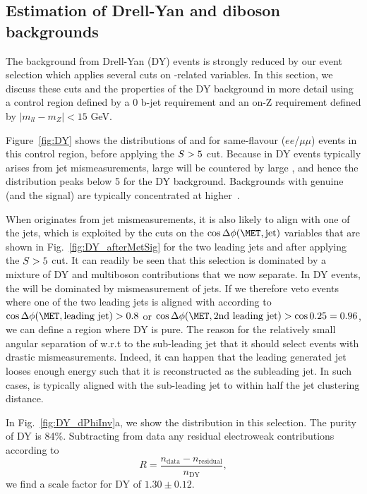 \subsection{Estimation of Drell-Yan and diboson backgrounds}
\label{sec:DY_diboson}

The background from Drell-Yan (DY) events is strongly reduced by our event selection which applies several cuts on \met-related variables.
In this section, we discuss these cuts and the properties of the DY background in more detail using a  
control region defined by a 0 b-jet requirement and an on-Z requirement defined by $|m_{ll} - m_Z| < 15$ GeV.

Figure~\ref{fig:DY} shows the distributions of \metSig and \mtll  for same-flavour ($ee$/$\mu\mu$) events in this control region, 
before applying the $S>5$ cut. Because \met in DY events typically arises from jet mismeasurements, large \met will be countered by large \HT, and hence
the \metSig distribution peaks below 5 for the DY background.  
Backgrounds with genuine \ETmiss (and the signal) are typically concentrated at higher~\metSig.

When \met originates from jet mismeasurements, it is also likely to align with one of the jets, which is exploited by the cuts on the $\cos{\Delta\phi(\met, \text{jet})}$ variables that are shown in Fig.~\ref{fig:DY_afterMetSig} for the two leading jets and after applying the $S>5$ cut. 
It can readily be seen that this selection is dominated by a mixture of DY and multiboson contributions that we now separate. 
In DY events, the \ETmiss will be dominated by mismeasurement of jets. 
If we therefore veto events where one of the two leading jets is aligned with \ETmiss according to $\cos{\Delta\phi(\met, \text{leading jet})} > 0.8$ or $\cos{\Delta\phi(\met, \text{2nd leading jet})} > \cos{0.25}=0.96$, 
we can define a region where DY is pure. 
The reason for the relatively small angular separation of \ETmiss w.r.t to the sub-leading jet that it should select events with
drastic mismeasurements. Indeed, it can happen that the leading generated jet looses enough energy such that it is reconstructed as the subleading jet. 
In such cases, \ETmiss is typically aligned with the sub-leading jet to within half the jet clustering distance.

In Fig.~\ref{fig:DY_dPhiInv}a, we show the \mtll distribution in this selection. The purity of DY is 84\%. 
Subtracting from data any residual electroweak contributions according to
\begin{equation}
R = \frac{n_\text{data}-n_\text{residual}}{n_\text{DY}},
\end{equation} 
we find a scale factor for DY of $1.30\pm 0.12$.

